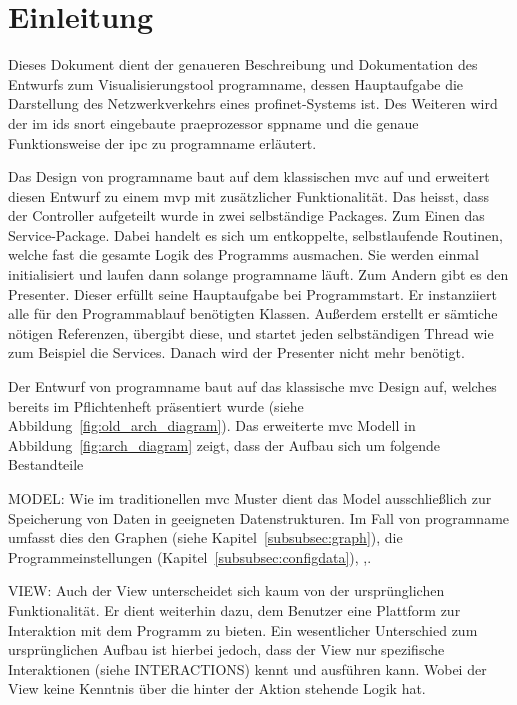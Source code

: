 \chapter{Einleitung}
Dieses Dokument dient der genaueren Beschreibung und Dokumentation des Entwurfs zum Visualisierungstool \gls{programname}, dessen Hauptaufgabe die Darstellung des Netzwerkverkehrs eines \gls{profinet}-Systems ist. Des Weiteren wird der im \gls{ids} \gls{snort} eingebaute \gls{praeprozessor} \gls{sppname} und die genaue Funktionsweise der \gls{ipc} zu \gls{programname} erläutert.\newline
\newline


Das Design von \gls{programname} baut auf dem klassischen \gls{mvc} auf und erweitert diesen Entwurf zu einem \gls{mvp} mit zusätzlicher Funktionalität. Das heisst, dass der Controller aufgeteilt wurde in zwei selbständige Packages. Zum Einen das Service-Package. Dabei handelt es sich um entkoppelte, selbstlaufende Routinen, welche fast die gesamte Logik des Programms ausmachen. Sie werden einmal initialisiert und laufen dann solange \gls{programname} läuft. Zum Andern gibt es den Presenter. Dieser erfüllt seine Hauptaufgabe bei Programmstart. Er instanziiert alle für den Programmablauf benötigten Klassen. Außerdem erstellt er sämtiche nötigen Referenzen, übergibt diese, und startet jeden selbständigen Thread wie zum Beispiel die Services. Danach wird der Presenter nicht mehr benötigt.

Der Entwurf von \gls{programname} baut auf das klassische \gls{mvc} Design auf, welches bereits im Pflichtenheft präsentiert wurde (siehe Abbildung~\ref{fig:old_arch_diagram}). Das erweiterte \gls{mvc} Modell in Abbildung~\ref{fig:arch_diagram} zeigt, dass der Aufbau sich um folgende Bestandteile

MODEL:
Wie im traditionellen \gls{mvc} Muster dient das Model ausschließlich zur Speicherung von Daten in geeigneten Datenstrukturen. Im Fall von \gls{programname} umfasst dies den Graphen (siehe Kapitel~\ref{subsubsec:graph}), die Programmeinstellungen (Kapitel~\ref{subsubsec:configdata}), ,.

VIEW:
Auch der View unterscheidet sich kaum von der ursprünglichen Funktionalität. Er dient weiterhin dazu, dem Benutzer eine Plattform zur Interaktion mit dem Programm zu bieten. Ein wesentlicher Unterschied zum ursprünglichen Aufbau ist hierbei jedoch, dass der View nur spezifische Interaktionen (siehe INTERACTIONS) kennt und ausführen kann. Wobei der View keine Kenntnis über die hinter der Aktion stehende Logik hat.

